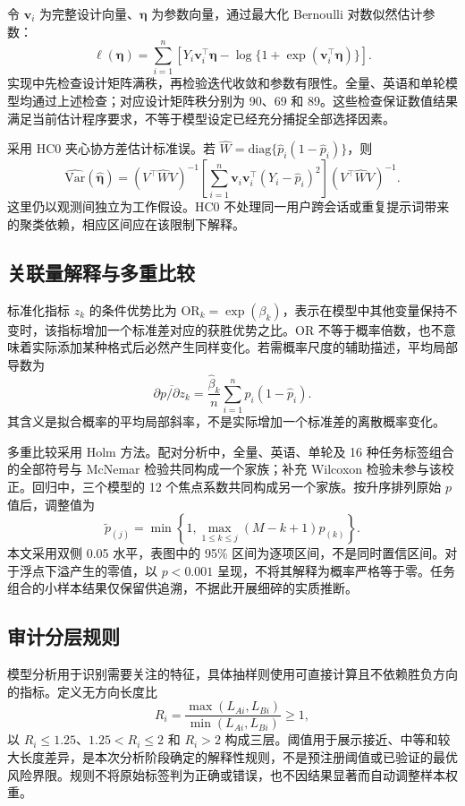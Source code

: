 \documentclass[UTF8,11pt,a4paper,fontset=windows]{ctexart}
\numberwithin{equation}{section}
\newcommand{\OR}{\mathrm{OR}}
\begin{document}
令 $\bm v_i$ 为完整设计向量、$\bm\eta$ 为参数向量，通过最大化 Bernoulli 对数似然估计参数：
\begin{equation}
 \ell(\bm\eta)=\sum_{i=1}^{n}\left[Y_i\bm v_i^\top\bm\eta
 -\log\{1+\exp(\bm v_i^\top\bm\eta)\}\right].
\end{equation}
实现中先检查设计矩阵满秩，再检验迭代收敛和参数有限性。全量、英语和单轮模型均通过上述检查；对应设计矩阵秩分别为 90、69 和 89。这些检查保证数值结果满足当前估计程序要求，不等于模型设定已经充分捕捉全部选择因素。

采用 HC0 夹心协方差估计标准误。若 $\widehat W=\mathrm{diag}\{\widehat p_i(1-\widehat p_i)\}$，则
\begin{equation}
 \widehat{\mathrm{Var}}(\widehat{\bm\eta})=
 (V^\top\widehat WV)^{-1}
 \left[\sum_{i=1}^{n}\bm v_i\bm v_i^\top(Y_i-\widehat p_i)^2\right]
 (V^\top\widehat WV)^{-1}.
\end{equation}
这里仍以观测间独立为工作假设。HC0 不处理同一用户跨会话或重复提示词带来的聚类依赖，相应区间应在该限制下解释。

\subsection{关联量解释与多重比较}
标准化指标 $z_k$ 的条件优势比为 $\OR_k=\exp(\beta_k)$，表示在模型中其他变量保持不变时，该指标增加一个标准差对应的获胜优势之比。OR 不等于概率倍数，也不意味着实际添加某种格式后必然产生同样变化。若需概率尺度的辅助描述，平均局部导数为
\begin{equation}
 \overline{\partial p/\partial z_k}=\frac{\widehat\beta_k}{n}
 \sum_{i=1}^{n}\widehat p_i(1-\widehat p_i).
\end{equation}
其含义是拟合概率的平均局部斜率，不是实际增加一个标准差的离散概率变化。

多重比较采用 Holm 方法\cite{holm}。配对分析中，全量、英语、单轮及 16 种任务标签组合的全部符号与 McNemar 检验共同构成一个家族；补充 Wilcoxon 检验未参与该校正。回归中，三个模型的 12 个焦点系数共同构成另一个家族。按升序排列原始 $p$ 值后，调整值为
\begin{equation}
 \widetilde p_{(j)}=\min\left\{1,\max_{1\leq k\leq j}(M-k+1)p_{(k)}\right\}.
\end{equation}
本文采用双侧 0.05 水平，表图中的 95\% 区间为逐项区间，不是同时置信区间。对于浮点下溢产生的零值，以 $p<0.001$ 呈现，不将其解释为概率严格等于零。任务组合的小样本结果仅保留供追溯，不据此开展细碎的实质推断。

\subsection{审计分层规则}
模型分析用于识别需要关注的特征，具体抽样则使用可直接计算且不依赖胜负方向的指标。定义无方向长度比
\begin{equation}\label{eq:ratio}
 R_i=\frac{\max(L_{Ai},L_{Bi})}{\min(L_{Ai},L_{Bi})}\geq1,
\end{equation}
以 $R_i\leq1.25$、$1.25<R_i\leq2$ 和 $R_i>2$ 构成三层。阈值用于展示接近、中等和较大长度差异，是本次分析阶段确定的解释性规则，不是预注册阈值或已验证的最优风险界限。规则不将原始标签判为正确或错误，也不因结果显著而自动调整样本权重。
\end{document}
